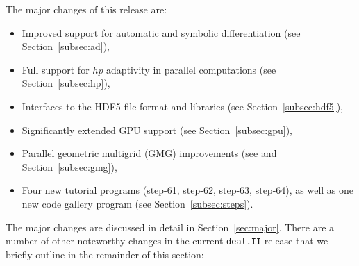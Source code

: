 \documentclass{ansarticle-preprint}
\newcommand{\specialword}[1]{\texttt{#1}}
\newcommand{\dealii}{{\specialword{deal.II}}\xspace}
\begin{document}
The major changes of this release are:
%
\begin{itemize}
  \item Improved support for automatic and symbolic differentiation (see
    Section~\ref{subsec:ad}),
  \item Full support for $hp$ adaptivity in parallel computations (see
    Section~\ref{subsec:hp}),
  \item Interfaces to the HDF5 file format and libraries (see
    Section~\ref{subsec:hdf5}),
  \item Significantly extended GPU support (see Section~\ref{subsec:gpu}),
  \item Parallel geometric multigrid (GMG) improvements (see
    \cite{ClevengerHeisterKanschatKronbichler2019} and
    Section~\ref{subsec:gmg}),
  \item Four new tutorial programs (step-61, step-62, step-63, step-64),
    as well as one new code gallery program (see
    Section~\ref{subsec:steps}).
\end{itemize}
%
The major changes are discussed in detail in Section~\ref{sec:major}. There
are a number of other noteworthy changes in the current \dealii{} release
that we briefly outline in the remainder of this section:
%
\end{document}
